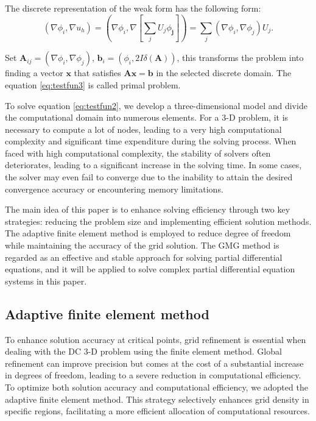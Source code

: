 \documentclass[extra, referee]{gji}
\begin{document}
The discrete representation of the weak form has the following form:
\begin{equation}
  \label{eq:testfun3}
  (\nabla {\phi_i}, \nabla u_ h)=\left(\nabla\phi_i, \nabla \left[\sum_{j} U_ {j}\phi_\mathbf{j} \right]\right)=\sum_ {j}(\nabla\phi_ {i}, \nabla\phi_ {j}) {U}_{j}.
\end{equation}

Set $\mathbf{A}_{ij}=(\nabla\phi_i, \nabla\phi_j)$, $\mathbf{b}_i=(\phi_i, 2 I
\delta( \mathbf{A}))$, this transforms the problem into finding a vector
$\mathbf{x}$ that satisfies $\mathbf{A}\mathbf{x}=\mathbf{b}$ in the selected
discrete domain. The equation \ref{eq:testfun3} is called primal problem.

To solve equation \ref{eq:testfun2}, we develop a three-dimensional model and
divide the  computational domain into numerous elements. For a 3-D problem, it
is necessary to compute a lot of nodes, leading to a very high computational
complexity and significant time expenditure during the solving process.
When faced with high computational complexity, the stability of solvers often
deteriorates, leading to a significant increase in the solving time. In some
cases, the solver may even fail to converge due to the inability to attain the
desired convergence accuracy or encountering memory limitations.

The main idea of this paper is to enhance solving efficiency through two key
strategies: reducing the problem size and implementing efficient solution
methods. The adaptive finite element method is employed to reduce degree of
freedom while maintaining the accuracy of the grid solution. The GMG method is
regarded as an effective and stable approach for solving partial differential
equations, and it will be applied to solve complex partial differential equation
systems in this paper.


\subsection{ Adaptive finite element method}
To enhance solution accuracy at critical points, grid refinement is essential
when dealing with the DC 3-D problem using the finite element method. Global
refinement can improve precision but comes at the cost of a substantial increase
in degrees of freedom, leading to a severe reduction in computational
efficiency. To optimize both solution accuracy and computational efficiency, we
adopted the adaptive finite element method. This strategy selectively enhances
grid density in specific regions, facilitating a more efficient allocation of
computational resources.
\end{document}
